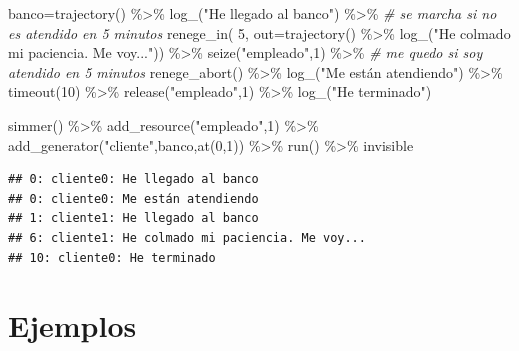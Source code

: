 \documentclass[
]{book}
\newenvironment{Shaded}{\begin{snugshade}}{\end{snugshade}}
\newcommand{\AttributeTok}[1]{\textcolor[rgb]{0.77,0.63,0.00}{#1}}
\newcommand{\CommentTok}[1]{\textcolor[rgb]{0.56,0.35,0.01}{\textit{#1}}}
\newcommand{\DecValTok}[1]{\textcolor[rgb]{0.00,0.00,0.81}{#1}}
\newcommand{\FunctionTok}[1]{\textcolor[rgb]{0.00,0.00,0.00}{#1}}
\newcommand{\NormalTok}[1]{#1}
\newcommand{\OtherTok}[1]{\textcolor[rgb]{0.56,0.35,0.01}{#1}}
\newcommand{\SpecialCharTok}[1]{\textcolor[rgb]{0.00,0.00,0.00}{#1}}
\newcommand{\StringTok}[1]{\textcolor[rgb]{0.31,0.60,0.02}{#1}}
\theoremstyle{definition}
\theoremstyle{definition}
\theoremstyle{definition}
\theoremstyle{definition}
\theoremstyle{remark}
\begin{document}
\begin{Shaded}
\begin{Highlighting}[]
\NormalTok{banco}\OtherTok{=}\FunctionTok{trajectory}\NormalTok{() }\SpecialCharTok{\%\textgreater{}\%}
  \FunctionTok{log\_}\NormalTok{(}\StringTok{"He llegado al banco"}\NormalTok{) }\SpecialCharTok{\%\textgreater{}\%}
  \CommentTok{\# se marcha si no es atendido en 5 minutos}
  \FunctionTok{renege\_in}\NormalTok{(}
    \DecValTok{5}\NormalTok{,}
    \AttributeTok{out=}\FunctionTok{trajectory}\NormalTok{() }\SpecialCharTok{\%\textgreater{}\%}
      \FunctionTok{log\_}\NormalTok{(}\StringTok{"He colmado mi paciencia. Me voy..."}\NormalTok{)) }\SpecialCharTok{\%\textgreater{}\%}
  \FunctionTok{seize}\NormalTok{(}\StringTok{"empleado"}\NormalTok{,}\DecValTok{1}\NormalTok{) }\SpecialCharTok{\%\textgreater{}\%}
  \CommentTok{\# me quedo si soy atendido en 5 minutos}
  \FunctionTok{renege\_abort}\NormalTok{() }\SpecialCharTok{\%\textgreater{}\%}
  \FunctionTok{log\_}\NormalTok{(}\StringTok{"Me están atendiendo"}\NormalTok{) }\SpecialCharTok{\%\textgreater{}\%}
  \FunctionTok{timeout}\NormalTok{(}\DecValTok{10}\NormalTok{) }\SpecialCharTok{\%\textgreater{}\%}
  \FunctionTok{release}\NormalTok{(}\StringTok{"empleado"}\NormalTok{,}\DecValTok{1}\NormalTok{) }\SpecialCharTok{\%\textgreater{}\%}
  \FunctionTok{log\_}\NormalTok{(}\StringTok{"He terminado"}\NormalTok{)}

\FunctionTok{simmer}\NormalTok{() }\SpecialCharTok{\%\textgreater{}\%}
  \FunctionTok{add\_resource}\NormalTok{(}\StringTok{"empleado"}\NormalTok{,}\DecValTok{1}\NormalTok{) }\SpecialCharTok{\%\textgreater{}\%}
  \FunctionTok{add\_generator}\NormalTok{(}\StringTok{"cliente"}\NormalTok{,banco,}\FunctionTok{at}\NormalTok{(}\DecValTok{0}\NormalTok{,}\DecValTok{1}\NormalTok{)) }\SpecialCharTok{\%\textgreater{}\%}
  \FunctionTok{run}\NormalTok{() }\SpecialCharTok{\%\textgreater{}\%}
\NormalTok{  invisible}
\end{Highlighting}
\end{Shaded}

\begin{verbatim}
## 0: cliente0: He llegado al banco
## 0: cliente0: Me están atendiendo
## 1: cliente1: He llegado al banco
## 6: cliente1: He colmado mi paciencia. Me voy...
## 10: cliente0: He terminado
\end{verbatim}

\hypertarget{ejemplos}{%
\section{Ejemplos}\label{ejemplos}}
\end{document}
